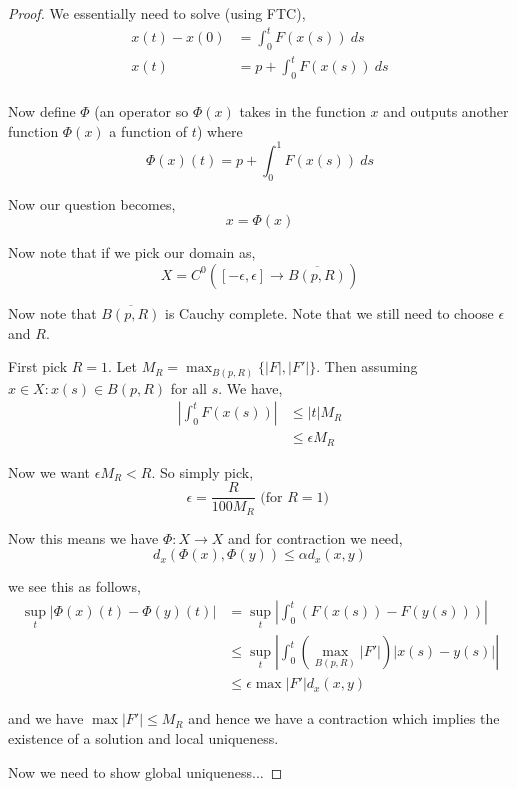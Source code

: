 \begin{proof}
  We essentially need to solve (using FTC),
  \begin{align*}
    x(t) - x(0) &= \int_{0}^{t}  F(x(s)) \ ds\\
              x(t) &= p +  \int_{0}^{t}  F(x(s)) \ ds\\
  \end{align*}

  Now define $\Phi$ (an operator so $\Phi(x)$ takes in the function $x$ and outputs another function $\Phi(x)$ a function of $t$) where $$\Phi(x)(t) = p + \int_{0}^{1}  F(x(s)) \ ds$$

  Now  our question becomes, 
  \[
    x = \Phi(x)
  \] 

  Now note that if we pick our domain as, 
  \[
    X = C^{0}([-\epsilon, \epsilon] \to \overline{B(p, R)})
  \]

  Now note that $\overline{B(p, R)}$ is Cauchy complete. Note that we still need to choose $\epsilon$ and $R$.

  \vspace{1em}
  
  First pick $R = 1$. Let $M_R = \max_{B(p, R)} \{|F|, |F'|\}$. Then assuming $x \in X: x(s) \in B(p, R)$ for all $s$. We have, 
  \begin{align*}
    \left | \int_{0}^{t}  F(x(s))\right | &\le |t| M_R\\
                                          &\le \epsilon M_R
  \end{align*}

  Now we want $\epsilon M_R < R$. So simply pick, 
  \[
    \epsilon = \frac{R}{100 M_R} \text{ (for $R = 1$) }
  \]

  Now this means we have $\Phi:X \to X$ and for contraction we need, 
  \[
    d_x (\Phi(x), \Phi(y)) \le \alpha d_x (x, y)
  \]

  we see this as follows,
  \begin{align*}
    \sup_t \left | \Phi(x)(t) - \Phi(y)(t)\right | &= \sup_t \left | \int_{0}^{t} (F(x(s)) - F(y(s)))\right |\\
                                                   &\le \sup_t \left | \int_{0}^{t} (\max_{B(p, R)} | F' |) |x(s) - y(s)|\right |\\
                                                   &\le \epsilon \max |F'| d_x(x, y)
  \end{align*}

  and we have $\max |F'| \le M_R$ and hence we have a contraction which implies the existence of a solution and local uniqueness.

  \vspace{1em}
  
  Now we need to show global uniqueness... 
\end{proof}


